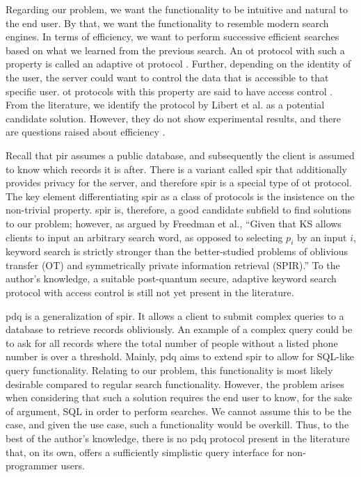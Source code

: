 Regarding our problem, we want the functionality to be intuitive and natural to the end user. By that, we want the functionality to resemble modern search engines. In terms of efficiency, we want to perform successive efficient searches based on what we learned from the previous search. An \acrshort{ot} protocol with such a property is called an adaptive \acrshort{ot} protocol \cite{C:NaoPin99}. Further, depending on the identity of the user, the server could want to control the data that is accessible to that specific user. \acrshort{ot} protocols with this property are said to have access control \cite{CCS:CamDubNev09}. From the literature, we identify the protocol by Libert et al. \cite{AC:LLMNW17} as a potential candidate solution. However, they do not show experimental results, and there are questions raised about efficiency \cite{SCN:CDLNT20}.

Recall that \acrshort{pir} assumes a public database, and subsequently the client is assumed to know which records it is after. There is a variant called \acrshort{spir} \cite{STOC:GIKM98} that additionally provides privacy for the server, and therefore \acrshort{spir} is a special type of \acrshort{ot} protocol. The key element differentiating \acrshort{spir} as a class of protocols is the insistence on the non-trivial property. \acrshort{spir} is, therefore, a good candidate subfield to find solutions to our problem; however, as argued by Freedman et al., ``Given that KS allows clients to input an arbitrary search word, as opposed to selecting $p_i$ by an input $i$, keyword search is strictly stronger than the better-studied problems of oblivious transfer (OT) and symmetrically private information retrieval (SPIR).'' \cite{TCC:FIPR05} To the author's knowledge, a suitable post-quantum secure, adaptive keyword search protocol with access control is still not yet present in the literature.

\acrfull{pdq} \cite{ACNS:BGHWW13} is a generalization of \acrshort{spir}. It allows a client to submit complex queries to a database to retrieve records obliviously. An example of a complex query could be to ask for all records where the total number of people without a listed phone number is over a threshold. Mainly, \acrshort{pdq} aims to extend \acrshort{spir} to allow for SQL-like query functionality. Relating to our problem, this functionality is most likely desirable compared to regular search functionality. However, the problem arises when considering that such a solution requires the end user to know, for the sake of argument, SQL in order to perform searches. We cannot assume this to be the case, and given the use case, such a functionality would be overkill. Thus, to the best of the author's knowledge, there is no \acrshort{pdq} protocol present in the literature that, on its own, offers a sufficiently simplistic query interface for non-programmer users.
